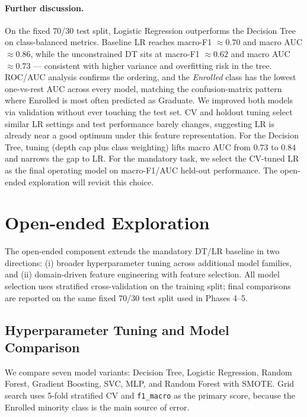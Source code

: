 \documentclass[11pt]{article}
\begin{document}
\paragraph{Further discussion.}
On the fixed 70/30 test split, Logistic Regression outperforms the
Decision Tree on class-balanced metrics. Baseline LR reaches
macro-F1 $\approx 0.70$ and macro AUC $\approx 0.86$, while the
unconstrained DT sits at macro-F1 $\approx 0.62$ and macro AUC
$\approx 0.73$ --- consistent with higher variance and overfitting
risk in the tree. ROC/AUC analysis confirms the ordering, and the
\emph{Enrolled} class has the lowest one-vs-rest AUC across every
model, matching the confusion-matrix pattern where Enrolled is most
often predicted as Graduate. We improved both models via
validation without ever touching the test set. CV and holdout
tuning select similar LR settings and test performance barely
changes, suggesting LR is already near a good optimum under this
feature representation. For the Decision Tree, tuning (depth cap
plus class weighting) lifts macro AUC from $0.73$ to $0.84$ and
narrows the gap to LR. For the mandatory task, we select the CV-tuned LR as the final
operating model on macro-F1/AUC held-out performance. The open-ended exploration 
will revisit this choice.

\section{Open-ended Exploration}

The open-ended component extends the mandatory DT/LR baseline in two
directions: (i) broader hyperparameter tuning across additional model
families, and (ii) domain-driven feature engineering with feature
selection. All model selection uses stratified cross-validation on the
training split; final comparisons are reported on the same fixed
70/30 test split used in Phases 4--5.

\subsection{Hyperparameter Tuning and Model Comparison}

We compare seven model variants: Decision Tree, Logistic Regression,
Random Forest, Gradient Boosting, SVC, MLP, and Random Forest with
SMOTE. Grid search uses 5-fold stratified CV and \texttt{f1\_macro}
as the primary score, because the Enrolled minority class is the
main source of error.
\end{document}
